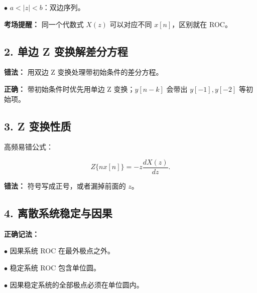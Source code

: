 \documentclass[11pt]{ctexart}
\begin{document}
\noindent\(\bullet\) \(a<|z|<b\)：双边序列。\par



\textbf{考场提醒：} 同一个代数式 \(X(z)\) 可以对应不同 \(x[n]\)，区别就在 ROC。\par



\subsection*{2. 单边 Z 变换解差分方程}



\textbf{错法：} 用双边 Z 变换处理带初始条件的差分方程。\par



\textbf{正确：} 带初始条件时优先用单边 Z 变换；\(y[n-k]\) 会带出 \(y[-1],y[-2]\) 等初始项。\par



\subsection*{3. Z 变换性质}



高频易错公式：\par

\[

Z\{n x[n]\}=-z\frac{dX(z)}{dz}.

\]



\textbf{错法：} 符号写成正号，或者漏掉前面的 \(z\)。\par



\subsection*{4. 离散系统稳定与因果}



\textbf{正确记法：}\par



\noindent\(\bullet\) 因果系统 ROC 在最外极点之外。\par

\noindent\(\bullet\) 稳定系统 ROC 包含单位圆。\par

\noindent\(\bullet\) 因果稳定系统的全部极点必须在单位圆内。\par
\end{document}
